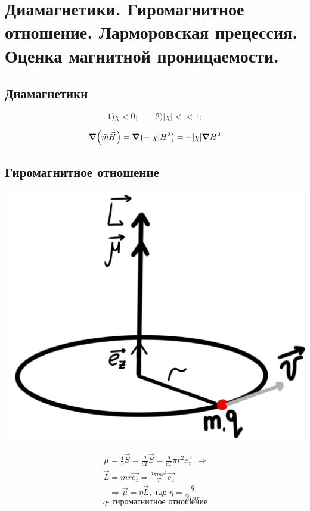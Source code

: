 \section{Диамагнетики. Гиромагнитное отношение. Ларморовская прецессия.
Оценка магнитной проницаемости.}

\subsection*{Диамагнетики}

\[
1)\chi<0;\qquad2)|\chi|<<1;
\]

\[
\grad(\vec{m}\vec{H})=\grad(-|\chi|H^2)=-|\chi|\grad H^2
\]

\subsection*{Гиромагнитное отношение}

\begin{minipage}[c]{0.4\textwidth} %
    \includegraphics[width=\textwidth]{im/75.png} %
\end{minipage}%
\hfill
\begin{minipage}[c]{0.6\textwidth} %
    \[
    \begin{array}{l|l}
        \vec{\mu}= \frac{I}{c}\vec{S}=\frac{q}{cT}\vec{S}=\frac{q}{cT}\pi r^2 \vec{e_z} & \Rightarrow \\
        \vec{L}=mr\vec{e_z}=\frac{2\pi mr^2}{T}\vec{e_z} 
    \end{array}
    \]
    \[
    \Rightarrow \vec{\mu}=\eta  \vec{L}, \text{ где } \eta=\frac{q}{2mc} 
    \]
    \[
    \eta\text{- гиромагнитное отношение}
    \]
\end{minipage}

